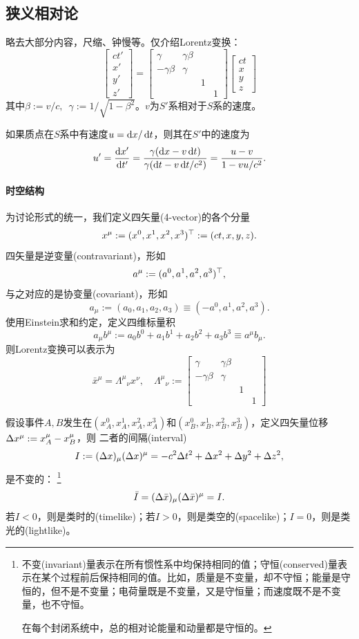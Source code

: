 \subsection{狭义相对论}
略去大部分内容，尺缩、钟慢等。仅介绍Lorentz变换：%
\begin{equation}
	\begin{bmatrix}
		ct'\\x'\\y'\\z'
	\end{bmatrix}=
	\begin{bmatrix}
		\gamma&\gamma\beta\\-\gamma\beta&\gamma\\ &&1\\ &&&1
	\end{bmatrix}
	\begin{bmatrix}
		ct\\x\\y\\z
	\end{bmatrix}
\end{equation}
其中$\beta:=v/c,\enspace\gamma:=1/\sqrt{1-\beta^2}$。$v$为$S'$系相对于$S$系的速度。

如果质点在$S$系中有速度$u=\mathop{}\!\mathrm{d} x/\mathop{}\!\mathrm{d} t$，则其在$S'$中的速度为
\[
    u'=\dv{x'}{t'}=\frac{\gamma(\d x-v\d t)}{\gamma(\d t-v\d t/c^2)}=\frac{u-v}{1-vu/c^2}.
\]
\paragraph{时空结构}
为讨论形式的统一，我们定义四矢量(4-vector)的各个分量
\[
    x^\mu:=(x^0,x^1,x^2,x^3)^\top:=(ct,x,y,z).
\]
四矢量是逆变量(contravariant)，形如
\[
    a^\mu:=(a^0,a^1,a^2,a^3)^\top,
\]
与之对应的是协变量(covariant)，形如
\[
    a_\mu:=(a_0,a_1,a_2,a_3)\equiv(-a^0,a^1,a^2,a^3).
\]
使用Einstein求和约定，定义四维标量积
\[
    a_\mu b^\mu:=a_0b^0+a_1b^1+a_2b^2+a_3b^3\equiv a^\mu b_\mu.
\]
则Lorentz变换可以表示为
\[
    \bar x^\mu=\Lambda^\mu{}_\nu x^\nu,\quad\Lambda^\mu{}_\nu:=
    \begin{bmatrix}
		\gamma&\gamma\beta\\-\gamma\beta&\gamma\\ &&1\\ &&&1
	\end{bmatrix}
\]

假设事件$A,B$发生在$(x_A^0,x_A^1,x_A^2,x_A^3)$和$(x_B^0,x_B^1,x_B^2,x_B^3)$，定义四矢量位移$\Delta x^\mu:=x_A^\mu-x_B^\mu$，则
二者的间隔(interval)
\[
    I:=(\Delta x)_\mu(\Delta x)^\mu=-c^2\Delta t^2+\Delta x^2+\Delta y^2+\Delta z^2,
\]
是不变的：
\footnote{
不变(invariant)量表示在所有惯性系中均保持相同的值；守恒(conserved)量表示在某个过程前后保持相同的值。比如，质量是不变量，却不守恒；能量是守恒的，但不是不变量；电荷量既是不变量，又是守恒量；而速度既不是不变量，也不守恒。

在每个封闭系统中，总的相对论能量和动量都是守恒的。}
\[
    \bar I=(\Delta\bar x)_\mu(\Delta\bar x)^\mu=I.
\]
若$I<0$，则是类时的(timelike)；若$I>0$，则是类空的(spacelike)；$I=0$，则是类光的(lightlike)。
